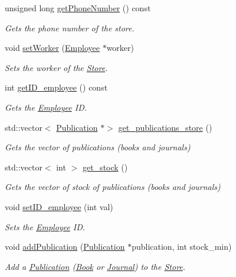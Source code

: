 \begin{DoxyCompactItemize}
unsigned long \hyperlink{class_store_afbef10a37143ea91b200d50e8e6b83d7}{get\+Phone\+Number} () const
\begin{DoxyCompactList}\small\item\em Gets the phone number of the store. \end{DoxyCompactList}\item 
void \hyperlink{class_store_a5486a87318c219a4cc85438c9b171ffc}{set\+Worker} (\hyperlink{class_employee}{Employee} $\ast$worker)
\begin{DoxyCompactList}\small\item\em Sets the worker of the \hyperlink{class_store}{Store}. \end{DoxyCompactList}\item 
int \hyperlink{class_store_a6b828ab56ffdcf4c8eb64e53ab998543}{get\+I\+D\+\_\+employee} () const
\begin{DoxyCompactList}\small\item\em Gets the \hyperlink{class_employee}{Employee} ID. \end{DoxyCompactList}\item 
std\+::vector$<$ \hyperlink{class_publication}{Publication} $\ast$$>$ \hyperlink{class_store_a05e802d26ede5fc4225074d1c732b3f3}{get\+\_\+publications\+\_\+store} ()
\begin{DoxyCompactList}\small\item\em Gets the vector of publications (books and journals) \end{DoxyCompactList}\item 
std\+::vector$<$ int $>$ \hyperlink{class_store_aafbf7d4dae475fca1d27fa1b212936c4}{get\+\_\+stock} ()
\begin{DoxyCompactList}\small\item\em Gets the vector of stock of publications (books and journals) \end{DoxyCompactList}\item 
void \hyperlink{class_store_a2d721f632d90947fae8c9eaa9f8abfcb}{set\+I\+D\+\_\+employee} (int val)
\begin{DoxyCompactList}\small\item\em Sets the \hyperlink{class_employee}{Employee} ID. \end{DoxyCompactList}\item 
void \hyperlink{class_store_aaea321fd77af274c34e8ade71ed02aa7}{add\+Publication} (\hyperlink{class_publication}{Publication} $\ast$publication, int stock\+\_\+min)
\begin{DoxyCompactList}\small\item\em Add a \hyperlink{class_publication}{Publication} (\hyperlink{class_book}{Book} or \hyperlink{class_journal}{Journal}) to the \hyperlink{class_store}{Store}. \end{DoxyCompactList}\item 
$$
\end{DoxyCompactItemize}
